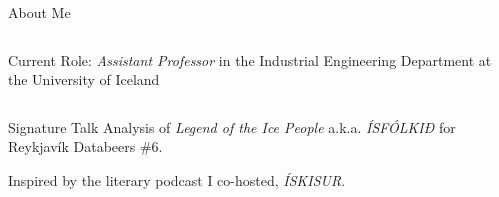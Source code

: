 \begin{frame}{About Me}
\begin{columns}[T]
  \begin{column}{0.35\textwidth} %
      \begin{exampleblock}{Current Role:}
        \emph{Assistant Professor} in the Industrial Engineering Department at the University of Iceland
      \end{exampleblock}
  \end{column}
\end{columns}

  \vfill
  \begin{block}{Signature Talk}
      Analysis of \emph{Legend of the Ice People} a.k.a. \emph{ÍSFÓLKIÐ} for Reykjavík Databeers \#6.

      \vspace{0.5em}

      Inspired by the literary podcast I co-hosted, \emph{ÍSKISUR}.
  \end{block}
\end{frame}


